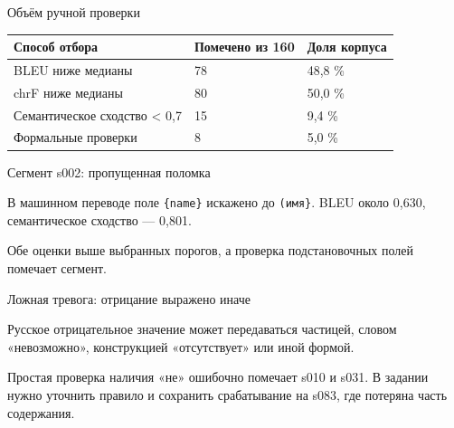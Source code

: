 \documentclass[aspectratio=169,12pt]{beamer}
\begin{document}
\begin{frame}{Объём ручной проверки}
\color{ink}
{\small\renewcommand{\arraystretch}{1.15}\begin{tabular}{@{}Л{0.53} Л{0.2} Л{0.19}@{}}\toprule
Способ отбора & Помечено из 160 & Доля корпуса\\\midrule
BLEU ниже медианы & 78 & 48,8 \%\\[0.15em]
chrF ниже медианы & 80 & 50,0 \%\\[0.15em]
Семантическое сходство < 0,7 & 15 & 9,4 \%\\[0.15em]
Формальные проверки & 8 & 5,0 \%\\[0.15em]\bottomrule\end{tabular}}
\end{frame}

\begin{frame}{Сегмент s002: пропущенная поломка}
\color{ink}
{\small В машинном переводе поле \texttt{\{name\}} искажено до \texttt{(имя\}}. BLEU около 0,630, семантическое сходство — 0,801.
\par\vspace{0.6em}Обе оценки выше выбранных порогов, а проверка подстановочных полей помечает сегмент.}
\end{frame}

\begin{frame}{Ложная тревога: отрицание выражено иначе}
\color{ink}
{\small Русское отрицательное значение может передаваться частицей, словом «невозможно», конструкцией «отсутствует» или иной формой.
\par\vspace{0.6em}Простая проверка наличия «не» ошибочно помечает s010 и s031. В задании нужно уточнить правило и сохранить срабатывание на s083, где потеряна часть содержания.}
\end{frame}
\end{document}
